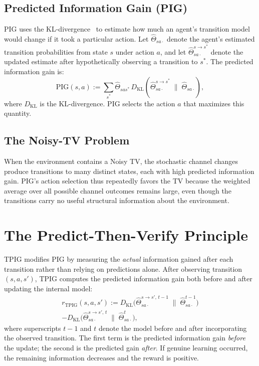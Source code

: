 \documentclass[letterpaper]{article} %
\begin{document}
\subsection{Predicted Information Gain (PIG)}

PIG uses the KL-divergence~\cite{Kullback1951information} to estimate
how much an agent's transition model would change if it took a
particular action.  Let
$\hat{\Theta}_{sa\cdot}$ denote the agent's estimated transition
probabilities from state $s$ under action $a$, and let
$\hat{\Theta}_{sa\cdot}^{s \to s^*}$ denote the updated estimate
after hypothetically observing a transition to $s^*$.  The predicted
information gain is:
\begin{equation}
  \textrm{PIG}(s,a) := \sum_{s^*} \hat{\Theta}_{sas^*}\,
  D_{\textrm{KL}}\!\left(\hat{\Theta}_{sa\cdot}^{s \to s^*}
  \;\|\;\hat{\Theta}_{sa\cdot}\right),
  \label{eq:PIG}
\end{equation}
where $D_{\textrm{KL}}$ is the KL-divergence.  PIG selects the action
$a$ that maximizes this quantity.

\subsection{The Noisy-TV Problem}

When the environment contains a Noisy TV, the stochastic channel
changes produce transitions to many distinct states, each with high
predicted information gain.  PIG's action selection thus repeatedly
favors the TV because the weighted average over all possible channel
outcomes remains large, even though the transitions carry no useful
structural information about the environment.

\section{The Predict-Then-Verify Principle}

TPIG modifies PIG by measuring the \emph{actual} information gained
after each transition rather than relying on predictions alone.  After
observing transition $(s,a,s')$, TPIG computes the predicted
information gain both before and after updating the internal model:
\begin{multline}
  r_{\textrm{TPIG}}(s,a,s') :=
  D_{\textrm{KL}}\!\bigl(\hat{\Theta}_{sa\cdot}^{s \to s',\,t-1}
  \;\|\;\hat{\Theta}_{sa\cdot}^{t-1}\bigr) \\
  - D_{\textrm{KL}}\!\bigl(\hat{\Theta}_{sa\cdot}^{s \to s',\,t}
  \;\|\;\hat{\Theta}_{sa\cdot}^{t}\bigr),
  \label{eq:TPIGReward}
\end{multline}
where superscripts $t{-}1$ and $t$ denote the model before and after
incorporating the observed transition.  The first term is the
predicted information gain \emph{before} the update; the second is the
predicted gain \emph{after}.  If genuine learning occurred, the
remaining information decreases and the reward is positive.
\end{document}

